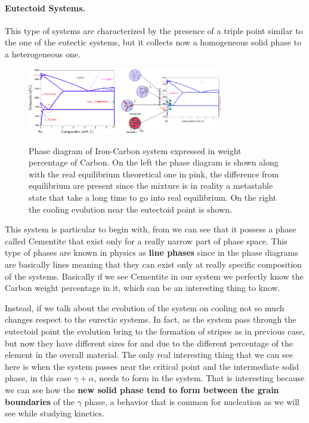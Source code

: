 \paragraph{Eutectoid Systems.} This type of systems are characterized by the presence of a triple point similar to the one of the eutectic systems, but it collects now a homogeneous solid phase to a heterogeneous one. 
\begin{figure}[b]
    \centering
    \includegraphics[width=0.35\textwidth]{Immagini/Fe-C.png}
    \includegraphics[width=0.4\textwidth]{Immagini/Fe-CEvo.png}
    \caption
    {
        Phase diagram of Iron-Carbon system expressed in weight percentage of Carbon. On the left the phase diagram is shown along with the real equilibrium theoretical one in pink, the difference from equilibrium are present since the mixture is in reality a metastable state that take a long time to go into real equilibrium. On the right the cooling evolution near the eutectoid point is shown. 
    }
    \label{fig:Fe-C}
\end{figure}
This system is particular to begin with, from  we can see that it possess a phase called Cementite that exist only for a really narrow part of phase space. This type of phases are known in physics as \textbf{line phases} since in the phase diagrams are basically lines meaning that they can exist only at really specific composition of the systems. Basically if we see Cementite in our system we perfectly know the Carbon weight percentage in it, which can be an interesting thing to know.

Instead, if we talk about the evolution of the system on cooling not so much changes respect to the eurectic systems. In fact, as the system pass through the eutectoid point the evolution bring to the formation of stripes as in previous case, but now they have different sizes for  and  due to the different percentage of the element in the overall material. The only real interesting thing that we can see here is when the system passes near the critical point and the intermediate solid phase, in this case $\gamma + \alpha$, needs to form in the system. That is interesting because we can see how the \textbf{new solid phase tend to form between the grain boundaries} of the $\gamma$ phase, a behavior that is common for nucleation as we will see while studying kinetics.

